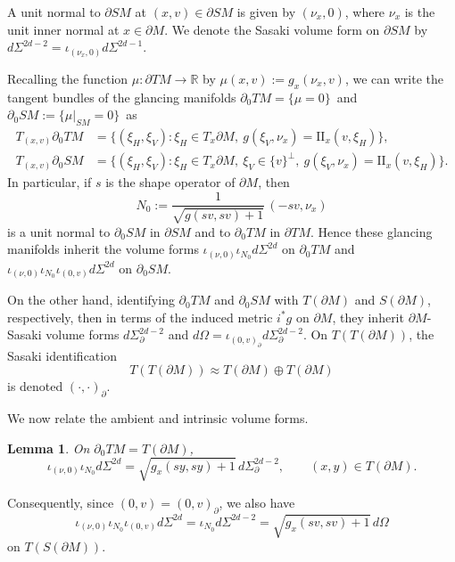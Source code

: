 \documentclass[11pt]{article}
\theoremstyle{plain}
\newtheorem{Lemma}[Theorem]{Lemma}
\theoremstyle{definition}
\theoremstyle{remark}
\def\Rm{{\mathbb{R}}}
\def\two{\mathrm{II}}
\begin{document}
A unit normal to $\partial SM$ at $(x,v) \in \partial SM$ is given by $(\nu_x,0)$, where $\nu_x$ is the unit inner normal at
$x\in \partial M$. We denote the Sasaki volume form on $\partial SM$ by $d\Sigma^{2d-2} = \iota_{(\nu_x,0)} d\Sigma^{2d-1}$.

Recalling the function $\mu\colon \partial TM\to \Rm$ by $\mu(x,v) := g_x(\nu_x, v)$, we can write the tangent bundles
of the glancing manifolds \hbox{$\partial_0 TM = \{\mu=0\}$ and $\partial_0 SM := \{\mu|_{SM} =0\}$}~as
\begin{align*}
T_{(x,v)} \partial_0 TM &= \{ (\xi_H,\xi_V)\colon \xi_H \in T_x \partial M,\ g(\xi_V, \nu_x) = \two_x(v,\xi_H) \}, \\
T_{(x,v)} \partial_0 SM &= \{ (\xi_H,\xi_V)\colon \xi_H \in T_x \partial M,\ \xi_V \in \{v\}^\perp,\ g(\xi_V, \nu_x) = \two_x(v,\xi_H) \}.
\end{align*}
In particular, if $s$ is the shape operator of $\partial M$, then
\begin{equation*}
N_0 := \frac{1}{\sqrt{g(sv,sv) + 1}}\, (-sv,\nu_x)
\end{equation*}
is a unit normal to $\partial_0 SM$ in $\partial SM$ and to $\partial_0 TM$ in $\partial TM$. Hence these glancing manifolds
inherit the volume forms $\iota_{(\nu,0)} \iota_{N_0} d\Sigma^{2d}$ on $\partial_0 TM$ and
$\iota_{(\nu,0)} \iota_{N_0} \iota_{(0,v)} d\Sigma^{2d}$ on $\partial_0 SM$.

On the other hand, identifying $\partial_0 TM$ and $\partial_0 SM$ with $T(\partial M)$ and $S(\partial M)$, respectively,
then in terms of the induced metric $i^* g$ on $\partial M$, they inherit $\partial M$-Sasaki volume forms $d\Sigma^{2d-2}_\partial$
and $d\Omega = \iota_{(0,v)_\partial} d\Sigma^{2d-2}_\partial$. On $T(T(\partial M))$, the Sasaki identification
\begin{equation*}
T(T (\partial M)) \approx T(\partial M) \oplus T(\partial M)
\end{equation*}
is denoted $(\cdot,\cdot)_\partial$.

We now relate the ambient and intrinsic volume forms.
\begin{Lemma}\label{lem:Sasakirec}
On $\partial_0 TM = T(\partial M)$,
\begin{equation*}
\iota_{(\nu,0)} \iota_{N_0} d\Sigma^{2d} = \sqrt{g_x(sy,sy) + 1}\,d\Sigma_\partial^{2d-2}, \qquad (x,y)\in T(\partial M).
\end{equation*}
\end{Lemma}
Consequently, since $(0,v) = (0,v)_\partial$, we also have
\begin{equation}
\iota_{(\nu,0)} \iota_{N_0} \iota_{(0,v)} d\Sigma^{2d} = \iota_{N_0} d\Sigma^{2d-2} = \sqrt{g_x(sv,sv)+1}\,d\Omega
\label{eq:Sasakirec2}
\end{equation}
on $T(S(\partial M))$.
\end{document}
